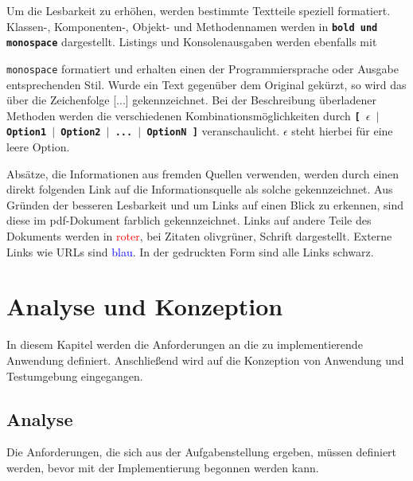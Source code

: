 \documentclass[
							a4paper, 
							11pt, 
							openany, 
							liststotoc,
							parskip=half, 
   							headings=normal
						]{scrreprt}
\begin{document}
Um die Lesbarkeit zu erhöhen, werden bestimmte Textteile speziell formatiert.
Klassen-, Komponenten-, Objekt- und Methodennamen werden in \textbf{\texttt{bold  und monospace}} dargestellt.\newline
Listings und Konsolenausgaben werden ebenfalls mit {\texttt{monospace} formatiert und erhalten einen der Programmiersprache oder Ausgabe entsprechenden Stil.\newline
Wurde ein Text gegenüber dem Original gekürzt, so wird das über die Zeichenfolge [...] gekennzeichnet.\newline
Bei der Beschreibung überladener Methoden werden die verschiedenen Kom\-bi\-na\-ti\-ons\-mö\-glich\-kei\-ten durch \textbf{\texttt{[ $\epsilon$ $\mid$ Option1 $\mid$ Option2 $\mid$ ... $\mid$ OptionN ]}} veranschaulicht.  \textbf{\texttt{$\epsilon$}} steht hierbei für eine leere Option.

Absätze, die Informationen aus fremden Quellen verwenden, werden durch einen direkt folgenden Link auf die Informationsquelle als solche gekennzeichnet.
Aus Gründen der besseren Lesbarkeit und um Links auf einen Blick zu erkennen, sind diese im pdf-Dokument farblich gekennzeichnet. Links auf andere Teile des Dokuments werden in \textcolor{red}{roter}, bei Zitaten \textcolor{OliveGreen}{olivgrüner}, Schrift dargestellt. Externe Links wie URLs sind \textcolor{blue}{blau}. In der gedruckten Form sind alle Links schwarz.

\clearpage



\chapter{Analyse und Konzeption} \label{se:analyse}
In diesem Kapitel werden die Anforderungen an die zu implementierende Anwendung definiert. Anschließend wird auf die Konzeption von Anwendung und Testumgebung eingegangen.

\section{Analyse} \label{se:analyse_anforderungen_definieren}
Die Anforderungen, die sich aus der Aufgabenstellung ergeben, müssen definiert werden, bevor mit der Implementierung begonnen werden kann.

}
\end{document}
